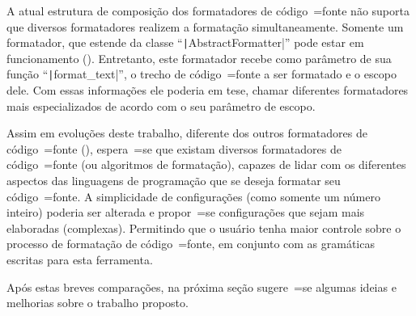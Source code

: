 A atual estrutura de composição dos formatadores de código~=fonte não suporta que diversos formatadores realizem a formatação simultaneamente.
Somente um formatador,
que estende da classe ``\texttt|AbstractFormatter|'' pode estar em funcionamento ().
Entretanto,
este formatador recebe como parâmetro de sua função ``\texttt|format_text|'',
o trecho de código~=fonte a ser formatado e
o escopo dele.
Com essas informações ele poderia em tese,
chamar diferentes formatadores mais especializados de acordo com o seu parâmetro de escopo.

Assim em evoluções deste trabalho,
diferente dos outros formatadores de código~=fonte (),
espera~=se que existam diversos formatadores de código~=fonte (ou algoritmos de formatação),
capazes de lidar com os diferentes aspectos das linguagens de programação que se deseja formatar seu código~=fonte.
A simplicidade de configurações (como somente um número inteiro) poderia ser alterada e
propor~=se configurações que sejam mais elaboradas (complexas).
Permitindo que o usuário tenha maior controle sobre o processo de formatação de código~=fonte,
em conjunto com as gramáticas escritas para esta ferramenta.

Após estas breves comparações,
na próxima seção sugere~=se algumas ideias e
melhorias sobre o trabalho proposto.


\section{}
\label{section:trabalhosFuturos}


